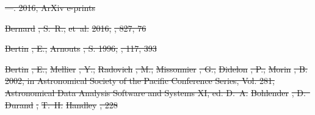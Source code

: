 \documentclass[numberedappendix]{emulateapj}
\providecommand{\DIFdel}[1]{{\protect\color{red}\sout{#1}}}                      %
\begin{document}
\DIFdel{---. 2016, ArXiv e-prints
}%

\DIFdel{Bernard}%
\DIFdel{, S.~R., }%
\DIFdel{et~al.}%
\DIFdel{2016, }%
\DIFdel{, 827, 76
}%

\DIFdel{Bertin}%
\DIFdel{, E., }%
\DIFdel{Arnouts}%
\DIFdel{, S. 1996, }%
\DIFdel{, 117, 393
}%

\DIFdel{Bertin}%
\DIFdel{, E., }%
\DIFdel{Mellier}%
\DIFdel{, Y., }%
\DIFdel{Radovich}%
\DIFdel{, M., }%
\DIFdel{Missonnier}%
\DIFdel{, G., }%
\DIFdel{Didelon}%
\DIFdel{, P.,
  }%
\DIFdel{Morin}%
\DIFdel{, B. 2002, in Astronomical Society of the Pacific Conference
  Series, Vol. 281, Astronomical Data Analysis Software and Systems XI, ed.
  D.~A. }%
\DIFdel{Bohlender}%
\DIFdel{, D.~}%
\DIFdel{Durand}%
\DIFdel{, }%
\DIFdel{T.~H. }%
\DIFdel{Handley}%
\DIFdel{, 228
}%
\end{document}
